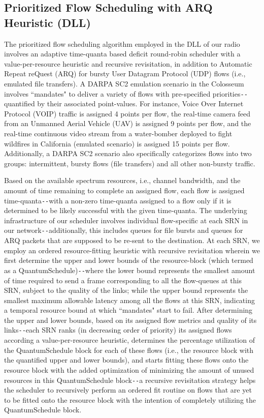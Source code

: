 \subsection{Prioritized Flow Scheduling with ARQ Heuristic (DLL)}\label{B.I.V}
The prioritized flow scheduling algorithm employed in the DLL of our radio involves an adaptive time-quanta based deficit round-robin scheduler with a value-per-resource heuristic and recursive revisitation, in addition to Automatic Repeat reQuest (ARQ) for bursty User Datagram Protocol (UDP) flows (i.e., emulated file transfers). A DARPA SC2 emulation scenario in the Colosseum involves ``mandates" to deliver a variety of flows with pre-specified priorities\texttt{-{}-}quantified by their associated point-values. For instance, Voice Over Internet Protocol (VOIP) traffic is assigned 4 points per flow, the real-time camera feed from an Unmanned Aerial Vehicle (UAV) is assigned 9 points per flow, and the real-time continuous video stream from a water-bomber deployed to fight wildfires in California (emulated scenario) is assigned 15 points per flow. Additionally, a DARPA SC2 scenario also specifically categorizes flows into two groups: intermittent, bursty flows (file transfers) and all other non-bursty traffic.

Based on the available spectrum resources, i.e., channel bandwidth, and the amount of time remaining to complete an assigned flow, each flow is assigned time-quanta\texttt{-{}-}with a non-zero time-quanta assigned to a flow only if it is determined to be likely successful with the given time-quanta. The underlying infrastructure of our scheduler involves individual flow-specific at each SRN in our network\texttt{-{}-}additionally, this includes queues for file bursts and queues for ARQ packets that are supposed to be re-sent to the destination. At each SRN, we employ an ordered resource-fitting heuristic with recursive revisitation wherein we first determine the upper and lower bounds of the resource-block (which termed as a QuantumSchedule)\texttt{-{}-}where the lower bound represents the smallest amount of time required to send a frame corresponding to all the flow-queues at this SRN, subject to the quality of the links; while the upper bound represents the smallest maximum allowable latency among all the flows at this SRN, indicating a temporal resource bound at which ``mandates" start to fail. After determining the upper and lower bounds, based on its assigned flow metrics and quality of its links\texttt{-{}-}each SRN ranks (in decreasing order of priority) its assigned flows according a value-per-resource heuristic, determines the percentage utilization of the QuantumSchedule block for each of these flows (i.e.,  the resource block with the quantified upper and lower bounds), and starts fitting these flows onto the resource block with the added optimization of minimizing the amount of unused resources in this QuantumSchedule block\texttt{-{}-}a recursive revisitation strategy helps the scheduler to recursively perform an ordered fit routine on flows that are yet to be fitted onto the resource block with the intention of completely utilizing the QuantumSchedule block.

